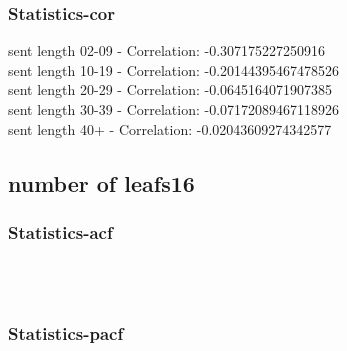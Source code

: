 \documentclass{article}%
\begin{document}
%
\newpage%
\subsubsection{Statistics{-}cor}%
\label{ssubsec:Statistics{-}cor}%
\noindent%
sent length 02-09 - Correlation: -0.307175227250916\\%
sent length 10-19 - Correlation: -0.20144395467478526\\%
sent length 20-29 - Correlation: -0.0645164071907385\\%
sent length 30-39 - Correlation: -0.07172089467118926\\%
sent length 40+ - Correlation: -0.02043609274342577\\

%
\newpage

%
\subsection{number of leafs16}%
\label{subsec:numberofleafs16}%
\subsubsection{Statistics{-}acf}%
\label{ssubsec:Statistics{-}acf}%


\begin{figure}[ht]%
\centering%
\setlength{\abovecaptionskip}{-35pt}%
%
%
\\%
%
%
\\%
%
\end{figure}

%
\newpage%
\subsubsection{Statistics{-}pacf}%
\label{ssubsec:Statistics{-}pacf}%
\end{document}
